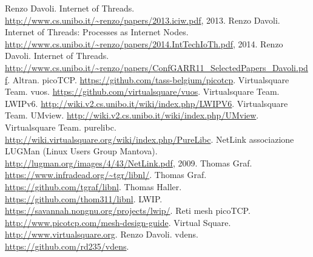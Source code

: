 
\begin{thebibliography}{90}             %
\rhead[\fancyplain{}{\bfseries \leftmark}]{\fancyplain{}{\bfseries
\thepage}}
 Renzo Davoli. Internet of Threads. \url{http://www.cs.unibo.it/~renzo/papers/2013.iciw.pdf}, 2013.
 Renzo Davoli. Internet of Threads: Processes as Internet Nodes. \url{http://www.cs.unibo.it/~renzo/papers/2014.IntTechIoTh.pdf}, 2014.
 Renzo Davoli. Internet of Threads. \url{http://www.cs.unibo.it/~renzo/papers/ConfGARR11_SelectedPapers_Davoli.pdf}.
 Altran. picoTCP. \url{https://github.com/tass-belgium/picotcp}.
 Virtualsquare Team. vuos. \url{https://github.com/virtualsquare/vuos}.
 Virtualsquare Team. LWIPv6. \url{http://wiki.v2.cs.unibo.it/wiki/index.php/LWIPV6}.
 Virtualsquare Team. UMview. \url{http://wiki.v2.cs.unibo.it/wiki/index.php/UMview}.
 Virtualsquare Team. purelibc. \url{http://wiki.virtualsquare.org/wiki/index.php/PureLibc}.
 NetLink associazione LUGMan (Linux Users Group Mantova). \url{http://lugman.org/images/4/43/NetLink.pdf}, 2009.
 Thomas Graf. \url{https://www.infradead.org/~tgr/libnl/}.
 Thomas Graf. \url{https://github.com/tgraf/libnl}.
 Thomas Haller. \url{https://github.com/thom311/libnl}.
 LWIP. \url{https://savannah.nongnu.org/projects/lwip/}.
 Reti mesh picoTCP. \url{http://www.picotcp.com/mesh-design-guide}.
 Virtual Square. \url{http://www.virtualsquare.org}.
 Renzo Davoli. vdens. \url{https://github.com/rd235/vdens}.
\end{thebibliography}
\clearpage{\pagestyle{empty}\cleardoublepage}
